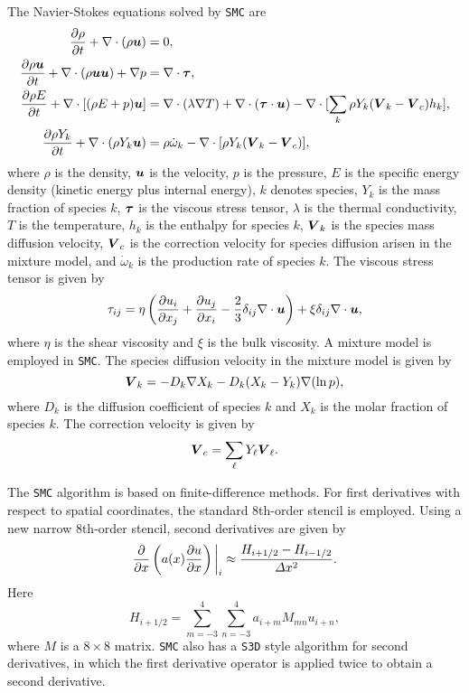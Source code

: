 \documentclass[11pt,letterpaper]{article}
\renewcommand{\vec}[1]{\mbox{\boldmath$#1$}}
\newcommand{\tensor}[1]{\mbox{\boldmath{\ensuremath{#1}}}}
\begin{document}
The Navier-Stokes equations solved by {\tt SMC} are
\begin{align}
\frac{\partial \rho}{\partial t} + \nabla \cdot (\rho
    \vec{u})= { } & 0, \\
\frac{\partial \rho \vec{u}}{\partial t} + \nabla \cdot (\rho
    \vec{u}\vec{u}) + \nabla p= { } & \nabla \cdot
  \tensor{\tau}, \\
\frac{\partial \rho E}{\partial t} + \nabla \cdot [(\rho E + p)
  \vec{u}] = { } & \nabla \cdot (\lambda \nabla T) + \nabla \cdot
  (\tensor{\tau} \cdot \vec{u}) - \nabla \cdot [\sum_k\rho Y_k
  (\vec{V}_k -\vec{V}_c) h_k ], \\
\frac{\partial \rho Y_k}{\partial t} + \nabla \cdot (\rho Y_k \vec{u})
= { } & \rho \dot{\omega}_k  - \nabla \cdot [\rho Y_k
  (\vec{V}_k -\vec{V}_c) ],
\end{align}
where $\rho$ is the density, $\vec{u}$ is the velocity, $p$ is the
pressure, $E$ is the specific energy density (kinetic energy plus
internal energy), $k$ denotes species, $Y_k$ is the mass fraction of
species $k$, $\tensor{\tau}$ is the viscous stress tensor, $\lambda$
is the thermal conductivity, $T$ is the temperature, $h_k$ is
the enthalpy for species $k$, $\vec{V}_k$ is the species mass
diffusion velocity, $\vec{V}_c$ is the correction velocity for species
diffusion arisen in the mixture model, and $\dot{\omega}_k$ is the
production rate of species $k$.  The viscous stress tensor is given by
\begin{equation}
  \tau_{ij} = \eta \left(\frac{\partial u_i}{\partial x_j} +
    \frac{\partial u_j}{\partial x_i} - \frac{2}{3}
    \delta_{ij} \nabla \cdot \vec{u} \right) +
  \xi \delta_{ij} \nabla \cdot \vec{u},
\end{equation}
where $\eta$ is the shear viscosity and $\xi$ is the bulk viscosity.
A mixture model is employed in {\tt SMC}.  The species diffusion
velocity in the mixture model is given by
\begin{equation}
  \vec{V}_k = -D_{k} \nabla X_k - D_{k} (X_k-Y_k)
  \nabla (\ln{p}),
\end{equation}
where $D_k$ is the diffusion coefficient of species $k$ and $X_k$ is
the molar fraction of species $k$.  The correction velocity is given by
\begin{equation}
  \vec{V}_c = \sum_\ell Y_\ell \vec{V}_\ell.
\end{equation}

The {\tt SMC} algorithm is based on finite-difference methods.  For
first derivatives with respect to spatial coordinates, the standard
8th-order stencil is employed.  Using a new narrow 8th-order stencil,
second derivatives are given by
\begin{equation}
\frac{\partial}{\partial x} \left(a(x) \frac{\partial u}{\partial x}
\right)\bigg{|}_{i} \approx \frac{H_{i+1/2} - H_{i-1/2}}{\Delta x^2}.
\end{equation}
Here
\begin{equation}
  H_{i+1/2} = \sum_{m=-3}^{4} \sum_{n=-3}^{4} a_{i+m} M_{mn} u_{i+n},
\end{equation}
where $M$ is a $8 \times 8$ matrix.  {\tt SMC} also has a {\tt S3D}
style algorithm for second derivatives, in which the first derivative
operator is applied twice to obtain a second derivative.
\end{document}
